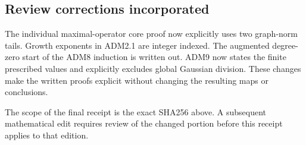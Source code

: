 \subsection{Review corrections
incorporated}\label{review-corrections-incorporated}

The individual maximal-operator core proof now explicitly uses two
graph-norm tails. Growth exponents in ADM2.1 are integer indexed. The
augmented degree-zero start of the ADM8 induction is written out. ADM9
now states the finite prescribed values and explicitly excludes global
Gaussian division. These changes make the written proofs explicit
without changing the resulting maps or conclusions.

The scope of the final receipt is the exact SHA256 above. A subsequent
mathematical edit requires review of the changed portion before this
receipt applies to that edition.
